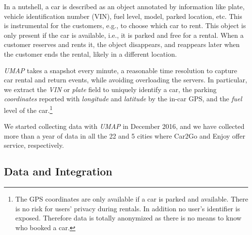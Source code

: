\documentclass[review, letterpaper,3p, 11pt]{elsarticle}
\newcommand{\tool}{\textit{UMAP}\xspace}
\providecommand{\DIFaddtex}[1]{{\protect\color{blue}\uwave{#1}}} %
\providecommand{\DIFaddbegin}{} %
\providecommand{\DIFaddend}{} %
\providecommand{\DIFdelbegin}{} %
\providecommand{\DIFdelend}{} %
\providecommand{\DIFadd}[1]{\texorpdfstring{\DIFaddtex{#1}}{#1}} %
\providecommand{\DIFdel}[1]{} %
\begin{document}
In a nutshell, a car is described as an object annotated by information like plate, vehicle identification number (VIN), fuel level, model, parked location, etc. 
This is instrumental for the customers, e.g., to choose which car to rent.
This object is only present if the car is available, i.e., it is parked and free for a rental. When a customer reserves and rents it, the object disappears, and reappears later when the customer ends the rental, likely in a different location.

\tool takes a snapshot \DIFdelbegin \DIFdel{$S(i)$ }\DIFdelend \DIFaddbegin \DIFadd{$S(t)$ }\DIFaddend every minute, a reasonable time resolution to capture car rental and return events, while avoiding overloading the servers.
In particular, we extract 
the \textit{VIN} or \textit{plate} field to uniquely identify a car, the parking \textit{coordinates} reported with \textit{longitude} and \textit{latitude} by the in-car GPS, and the \textit{fuel} level of the car.\footnote{The GPS coordinates are only available if a car is parked and available. There is no risk for users' privacy during rentals. In addition no user's identifier is exposed. Therefore data is totally anonymized as there is no means to know who booked a car.}


We started collecting data with \tool in December 2016, and we have collected more than a year of data in all the 22 and 5 cities where Car2Go and Enjoy offer service, respectively. 

\subsection{Data \DIFdelbegin \DIFdel{Normalization }\DIFdelend \DIFaddbegin \DIFadd{Normalisation }\DIFaddend and Integration}
\end{document}

